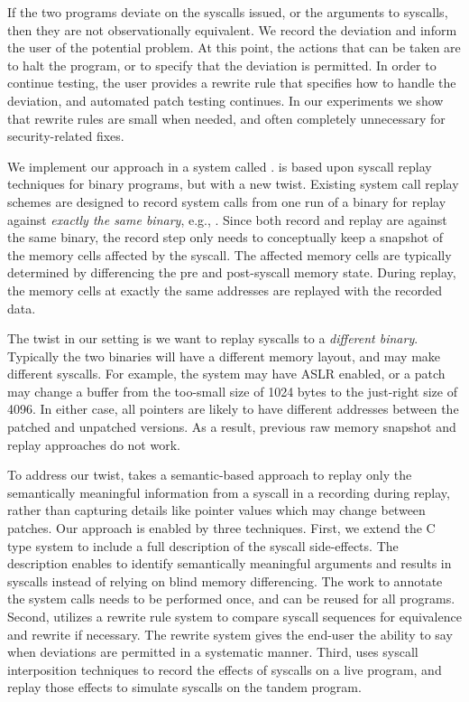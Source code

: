 If the two programs deviate on the syscalls issued, or the arguments to
syscalls, then  they are not observationally equivalent.
We record the deviation and inform the user of the potential problem.
At this point, the actions that can be taken are to halt the program,
or to specify that the deviation is permitted.  In order to continue
testing, the user provides a rewrite rule that specifies how to handle the
deviation, and automated patch testing continues. In our experiments
we show that rewrite rules are small when needed, and often
completely unnecessary for security-related fixes.


We implement our approach in a system called \tachyon. \tachyon is
based upon syscall replay techniques for binary programs, but with a
new twist.  Existing system call replay schemes are designed to record
system calls from one run of a binary for replay against \emph{exactly
  the same binary}, e.g., \cite{undodb,patil:2010,guo:2008}.  Since
both record and replay are against the same binary, the record step
only needs to conceptually keep a snapshot of the memory cells
affected by the syscall.  The affected memory cells are typically
determined by differencing the pre and post-syscall memory state. During
replay, the memory cells at exactly the same addresses are replayed
with the recorded data.

The twist in our setting is we want to replay syscalls to a
\emph{different binary}.  Typically the two binaries will have a
different memory layout, and may make different syscalls. For
example, the system may have ASLR enabled, or a patch may change a
buffer from the too-small size of 1024 bytes to the just-right size of
4096. In either case, all pointers are likely to have different
addresses between the patched and unpatched versions. As a result,
previous raw memory snapshot and replay approaches do not work.


To address our twist, \tachyon takes a semantic-based approach to
replay only the semantically meaningful information from a syscall
in a recording during replay, rather than capturing details like
pointer values which may change between patches.  Our approach is
enabled by three techniques.  First, we extend the C type system to
include a full description of the syscall side-effects.  The
description enables \tachyon to identify semantically meaningful
arguments and results in syscalls instead of relying on blind
memory differencing.  The work to annotate the system calls needs to be
performed once, and can be reused for all programs.  Second, \tachyon
utilizes a rewrite rule system to compare syscall sequences for
equivalence and rewrite if necessary. The rewrite system gives the
end-user the ability to say when deviations are permitted in a
systematic manner.  Third, \tachyon uses syscall interposition
techniques to record the effects of syscalls on a live program, and
replay those effects to simulate syscalls on the tandem program.



